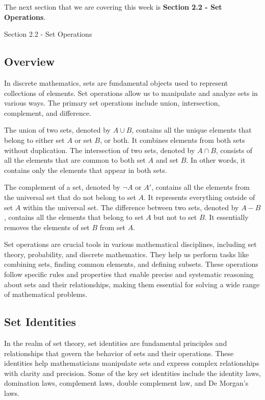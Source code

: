 The next section that we are covering this week is \textbf{Section 2.2 - Set Operations}.

\begin{notes}{Section 2.2 - Set Operations}
    \subsection*{Overview}

    In discrete mathematics, sets are fundamental objects used to represent collections of elements. Set operations allow us to manipulate and analyze sets in various ways. The primary set operations include 
    union, intersection, complement, and difference.

    The union of two sets, denoted by $A \cup B$, contains all the unique elements that belong to either set $A$ or set $B$, or both. It combines elements from both sets without duplication. The intersection of 
    two sets, denoted by $A \cap B$, consists of all the elements that are common to both set $A$ and set $B$. In other words, it contains only the elements that appear in both sets.
    
    The complement of a set, denoted by $\neg A$ or $A'$, contains all the elements from the universal set that do not belong to set $A$. It represents everything outside of set $A$ within the universal set. The 
    difference between two sets, denoted by $A - B$, contains all the elements that belong to set $A$ but not to set $B$. It essentially removes the elements of set $B$ from set $A$.
    
    Set operations are crucial tools in various mathematical disciplines, including set theory, probability, and discrete mathematics. They help us perform tasks like combining sets, finding common elements, 
    and defining subsets. These operations follow specific rules and properties that enable precise and systematic reasoning about sets and their relationships, making them essential for solving a wide range 
    of mathematical problems.
    
    \subsection*{Set Identities}

    In the realm of set theory, set identities are fundamental principles and relationships that govern the behavior of sets and their operations. These identities help mathematicians manipulate sets and 
    express complex relationships with clarity and precision. Some of the key set identities include the identity laws, domination laws, complement laws, double complement law, and De Morgan's laws.


\end{notes}
